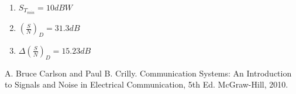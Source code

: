 \documentclass[en,boletin]{uah}
\begin{document}
{
\begin{enumerate}
	\item $S_{T_{min}} = 10dBW$
	\item $\left ( \frac{S}{N} \right )_D = 31.3 dB$
	\item $\Delta \left ( \frac{S}{N} \right )_D = 15.23 dB$
\end{enumerate}
}




\begin{thebibliography}{100}
	 A. Bruce Carlson and Paul B. Crilly. Communication Systems: An Introduction to Signals and Noise in Electrical Communication, 5th Ed. McGraw-Hill, 2010.
	\end{thebibliography}
	
	
\end{document}
